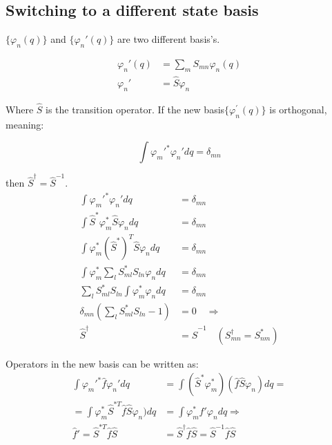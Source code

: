 			\subsection{Switching to a different state basis}
				$\{\varphi_n(q) \}$ and $\{\varphi_n'(q) \}$ are two different basis's.
				
				\begin{align} 
					\varphi_n'(q) &= \sum_m S_{mn} \varphi_n(q) \\
					\varphi_n' &= \hat{S} \varphi_n 
				\end{align}
				
				Where $\hat{S}$ is the transition operator. If the new basis$\{\varphi_n^{'}(q) \}$ is orthogonal, meaning:
				
				\begin{equation}
					\int \varphi_m'^* \varphi_n' dq = \delta_{mn}
				\end{equation}
	
				then $\hat{S}^\dag = \hat{S}^{-1}$.
				\begin{align}
					\int \varphi_m'^* \varphi_n' dq &= \delta_{mn} \nonumber \\
					\int \hat{S}^*\varphi_m^*  \hat{S}\varphi_n dq &= \delta_{mn} \nonumber \\					
					\int \varphi_m^* (\hat{S}^*)^T \hat{S}\varphi_n dq &= \delta_{mn} \nonumber \\					
					\int \varphi_m^* \sum_l S_{ml}^* S_{ln}\varphi_n dq &= \delta_{mn} \nonumber \\				
					\sum_l S_{ml}^* S_{ln} \int \varphi_m^* \varphi_n dq &= \delta_{mn} \nonumber \\
					\delta_{mn}(\sum_l S_{ml}^* S_{ln} - 1) &= 0 \quad \Rightarrow \nonumber \\
					\hat{S}^\dag &= \hat{S}^{-1} \quad (S_{mn}^\dag = S_{nm}^*)
				\end{align}
				
				Operators in the new basis can be written as:
				\begin{align}
					\int \varphi_m'^* \hat{f} \varphi_n' dq &= \int(\hat{S}^* \varphi_m^* )(\hat{f} \hat{S} \varphi_n) dq = \nonumber \\
					= \int \varphi_m^* \hat{S}^{*T} \hat{f} \hat{S} \varphi_n) dq &= \int \varphi_m^* \hat{f}' \varphi_n dq \Rightarrow \nonumber \\
					\hat{f}' = \hat{S}^{*T}\hat{f}\hat{S} &= \hat{S}^\dag \hat{f} \hat{S} = \hat{S}^{-1}\hat{f}\hat{S}
				\end{align}
				
